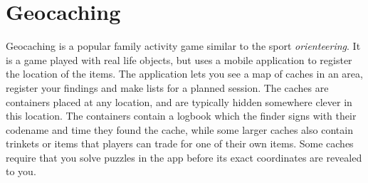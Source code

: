 \section{Geocaching}

Geocaching is a popular family activity game similar to the sport \emph{orienteering}. It is a game played with real life objects, but uses a mobile application to register the location of the items. The application lets you see a map of caches in an area, register your findings and make lists for a planned session. The caches are containers placed at any location, and are typically hidden somewhere clever in this location. The containers contain a logbook which the finder signs with their codename and time they found the cache, while some larger caches also contain trinkets or items that players can trade for one of their own items. Some caches require that you solve puzzles in the app before its exact coordinates are revealed to you.

